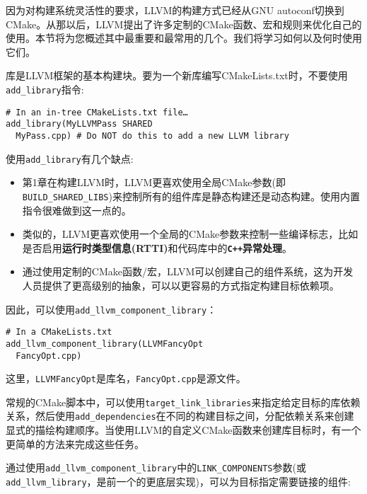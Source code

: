 因为对构建系统灵活性的要求，LLVM的构建方式已经从GNU autoconf切换到CMake。从那以后，LLVM提出了许多定制的CMake函数、宏和规则来优化自己的使用。本节将为您概述其中最重要和最常用的几个。我们将学习如何以及何时使用它们。


库是LLVM框架的基本构建块。要为一个新库编写CMakeLists.txt时，不要使用\texttt{add\_library}指令:

\begin{lstlisting}[style=styleCMake]
# In an in-tree CMakeLists.txt file…
add_library(MyLLVMPass SHARED
  MyPass.cpp) # Do NOT do this to add a new LLVM library
\end{lstlisting}

使用\texttt{add\_library}有几个缺点:

\begin{itemize}
\item 第1章在构建LLVM时，LLVM更喜欢使用全局CMake参数(即\texttt{BUILD\_SHARED\_LIBS})来控制所有的组件库是静态构建还是动态构建。使用内置指令很难做到这一点的。

\item 类似的，LLVM更喜欢使用一个全局的CMake参数来控制一些编译标志，比如是否启用\textbf{运行时类型信息(RTTI)}和代码库中的\textbf{\texttt{C++}异常处理}。

\item 通过使用定制的CMake函数/宏，LLVM可以创建自己的组件系统，这为开发人员提供了更高级别的抽象，可以以更容易的方式指定构建目标依赖项。

\end{itemize}

因此，可以使用\texttt{add\_llvm\_component\_library}：

\begin{lstlisting}[style=styleCMake]
# In a CMakeLists.txt
add_llvm_component_library(LLVMFancyOpt
  FancyOpt.cpp)
\end{lstlisting}

这里，\texttt{LLVMFancyOpt}是库名，\texttt{FancyOpt.cpp}是源文件。

常规的CMake脚本中，可以使用\texttt{target\_link\_libraries}来指定给定目标的库依赖关系，然后使用\texttt{add\_dependencies}在不同的构建目标之间，分配依赖关系来创建显式的描绘构建顺序。当使用LLVM的自定义CMake函数来创建库目标时，有一个更简单的方法来完成这些任务。

通过使用\texttt{add\_llvm\_component\_library}中的\texttt{LINK\_COMPONENTS}参数(或\texttt{add\_llvm\_library}，是前一个的更底层实现)，可以为目标指定需要链接的组件:

